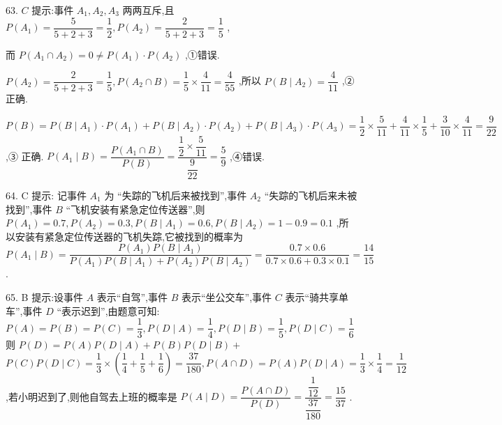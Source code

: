 63. $C$ 提示:事件 ${A}_{1},{A}_{2},{A}_{3}$ 两两互斥,且 $P\left( {A}_{1}\right)  = \dfrac{5}{5 + 2 + 3} = \dfrac{1}{2},P\left( {A}_{2}\right)  = \dfrac{2}{5 + 2 + 3} = \dfrac{1}{5}$ ,

而 $P\left( {{A}_{1} \cap  {A}_{2}}\right)  = 0 \neq  P\left( {A}_{1}\right)  \cdot  P\left( {A}_{2}\right)$ ,①错误.

$P\left( {A}_{2}\right)  = \dfrac{2}{5 + 2 + 3} = \dfrac{1}{5},P\left( {{A}_{2} \cap  B}\right)  = \dfrac{1}{5} \times  \dfrac{4}{11} = \dfrac{4}{55}$ ,所以 $P\left( {B \mid  {A}_{2}}\right)  = \dfrac{4}{11}$ ,②正确.

$P\left( B\right)  = P\left( {B \mid  {A}_{1}}\right)  \cdot  P\left( {A}_{1}\right)  + P\left( {B \mid  {A}_{2}}\right)  \cdot  P\left( {A}_{2}\right)  + P\left( {B \mid  {A}_{3}}\right)  \cdot  P\left( {A}_{3}\right)  = \dfrac{1}{2} \times  \dfrac{5}{11} + \dfrac{4}{11} \times  \dfrac{1}{5} + \dfrac{3}{10} \times  \dfrac{4}{11} = \dfrac{9}{22}$ ,③ 正确. $P\left( {{A}_{1} \mid  B}\right)  = \dfrac{P\left( {{A}_{1} \cap  B}\right) }{P\left( B\right) } = \dfrac{\dfrac{1}{2} \times  \dfrac{5}{11}}{\dfrac{9}{22}} = \dfrac{5}{9}$ ,④错误.

64. C 提示: 记事件 ${A}_{1}$ 为 “失踪的飞机后来被找到”,事件 ${A}_{2}$ “失踪的飞机后来未被找到”,事件 $B$ “飞机安装有紧急定位传送器”,则 $P\left( {A}_{1}\right)  = {0.7},P\left( {A}_{2}\right)  = {0.3},P\left( {B \mid  {A}_{1}}\right)  = {0.6},P\left( {B \mid  {A}_{2}}\right)  = 1 - {0.9} = {0.1}$ ,所以安装有紧急定位传送器的飞机失踪,它被找到的概率为 $P\left( {{A}_{1} \mid  B}\right)  = \dfrac{P\left( {A}_{1}\right) P\left( {B \mid  {A}_{1}}\right) }{P\left( {A}_{1}\right) P\left( {B \mid  {A}_{1}}\right)  + P\left( {A}_{2}\right) P\left( {B \mid  {A}_{2}}\right) } = \dfrac{{0.7} \times  {0.6}}{{0.7} \times  {0.6} + {0.3} \times  {0.1}} = \dfrac{14}{15}$ .

65. B 提示:设事件 $A$ 表示“自驾”,事件 $B$ 表示“坐公交车”,事件 $C$ 表示“骑共享单车”,事件 $D$ “表示迟到”,由题意可知: $P\left( A\right)  = P\left( B\right)  = P\left( C\right)  = \dfrac{1}{3},P\left( {D \mid  A}\right)  = \dfrac{1}{4},P\left( {D \mid  B}\right)  = \dfrac{1}{5},P\left( {D \mid  C}\right)  = \dfrac{1}{6}$ 则 $P\left( D\right)  = P\left( A\right) P\left( {D \mid  A}\right)  + P\left( B\right) P\left( {D \mid  B}\right)  +$  $P\left( C\right) P\left( {D \mid  C}\right)  = \dfrac{1}{3} \times  \left( {\dfrac{1}{4} + \dfrac{1}{5} + \dfrac{1}{6}}\right)  = \dfrac{37}{180},P\left( {A \cap  D}\right)  = P\left( A\right) P\left( {D \mid  A}\right)  = \dfrac{1}{3} \times  \dfrac{1}{4} = \dfrac{1}{12}$ ,若小明迟到了,则他自驾去上班的概率是 $P\left( {A \mid  D}\right)  = \dfrac{P\left( {A \cap  D}\right) }{P\left( D\right) } = \dfrac{\dfrac{1}{12}}{\dfrac{37}{180}} = \dfrac{15}{37}$ .

